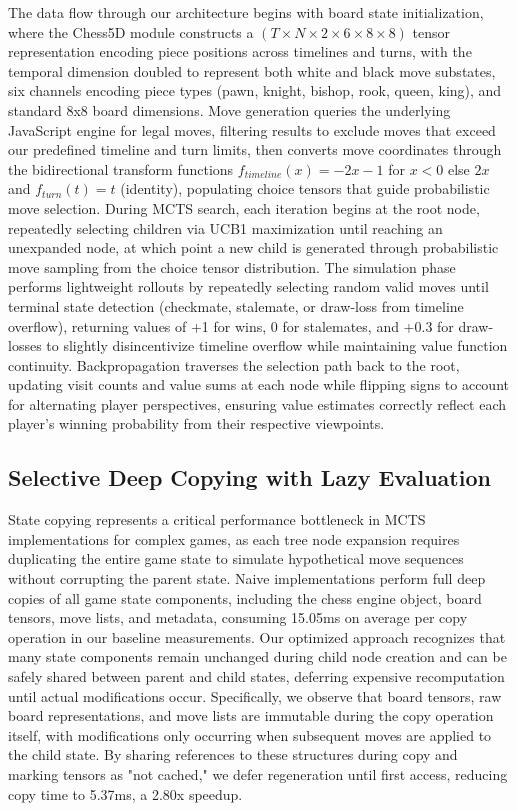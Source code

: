 \documentclass{article}
\begin{document}
The data flow through our architecture begins with board state initialization, where the Chess5D module constructs a $(T \times N \times 2 \times 6 \times 8 \times 8)$ tensor representation encoding piece positions across timelines and turns, with the temporal dimension doubled to represent both white and black move substates, six channels encoding piece types (pawn, knight, bishop, rook, queen, king), and standard 8x8 board dimensions. Move generation queries the underlying JavaScript engine for legal moves, filtering results to exclude moves that exceed our predefined timeline and turn limits, then converts move coordinates through the bidirectional transform functions $f_{timeline}(x) = -2x-1$ for $x<0$ else $2x$ and $f_{turn}(t) = t$ (identity), populating choice tensors that guide probabilistic move selection. During MCTS search, each iteration begins at the root node, repeatedly selecting children via UCB1 maximization until reaching an unexpanded node, at which point a new child is generated through probabilistic move sampling from the choice tensor distribution. The simulation phase performs lightweight rollouts by repeatedly selecting random valid moves until terminal state detection (checkmate, stalemate, or draw-loss from timeline overflow), returning values of +1 for wins, 0 for stalemates, and +0.3 for draw-losses to slightly disincentivize timeline overflow while maintaining value function continuity. Backpropagation traverses the selection path back to the root, updating visit counts and value sums at each node while flipping signs to account for alternating player perspectives, ensuring value estimates correctly reflect each player's winning probability from their respective viewpoints.

\subsection{Selective Deep Copying with Lazy Evaluation}

State copying represents a critical performance bottleneck in MCTS implementations for complex games, as each tree node expansion requires duplicating the entire game state to simulate hypothetical move sequences without corrupting the parent state. Naive implementations perform full deep copies of all game state components, including the chess engine object, board tensors, move lists, and metadata, consuming 15.05ms on average per copy operation in our baseline measurements. Our optimized approach recognizes that many state components remain unchanged during child node creation and can be safely shared between parent and child states, deferring expensive recomputation until actual modifications occur. Specifically, we observe that board tensors, raw board representations, and move lists are immutable during the copy operation itself, with modifications only occurring when subsequent moves are applied to the child state. By sharing references to these structures during copy and marking tensors as "not cached," we defer regeneration until first access, reducing copy time to 5.37ms, a 2.80x speedup.
\end{document}
